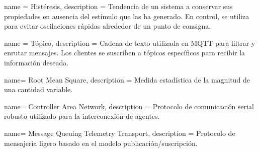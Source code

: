 {
    name = Histéresis,
    description = {Tendencia de un sistema a conservar sus propiedades en ausencia del estímulo que las ha generado. En control, se utiliza para evitar oscilaciones rápidas alrededor de un punto de consigna.}
}

{
    name = Tópico,
    description = {Cadena de texto utilizada en MQTT para filtrar y enrutar mensajes. Los clientes se suscriben a tópicos específicos para recibir la información deseada.}
}

{
    name= Root Mean Square,
    description = {Medida estadística de la magnitud de una cantidad variable.}
}

{
    name= Controller Area Network,
    description = {Protocolo de comunicación serial robusto utilizado para la interconexión de agentes.}
}

{
    name= Message Queuing Telemetry Transport,
    description = {Protocolo de mensajería ligero basado en el modelo publicación/suscripción.}
}
